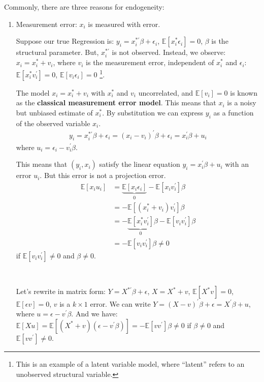 Commonly, there are three reasons for endogeneity:
\begin{enumerate}
    \item Measurement error: $x_i$ is measured with error.
        
        Suppose our true Regression is: $y_i = x_i^{* \prime} \beta +\epsilon_i$, $\mathbb{E}[x_i^* \epsilon_i] = 0$, $\beta$ is the structural parameter.
        But, $x_i^{* \prime}$ is not observed. Instead, we observe: $x_i = x_i^* + v_i$, 
        where $v_i$ is the measurement error, independent of $x_i^*$ and $\epsilon_i$: $\mathbb{E}[x_i^* v_i^{\prime}] = 0$, $\mathbb{E}[v_i \epsilon_i] = 0$
        \footnote{This is an example of a latent variable model, where ``latent'' refers to an unobserved structural variable.}.

        The model $x_i = x_i^* + v_i$ with $x_i^*$ and $v_{i}$ uncorrelated, and $\mathbb{E}[v_i] = 0$ is known as the \textbf{classical measurement error model}.
        This means that $x_i$ is a noisy but unbiased estimate of $x_i^*$.
        By substitution we can express $y_i$ as a function of the observed variable $x_i$.
        \begin{gather*}
            y_i = x_i^{* \prime} \beta +\epsilon_i = (x_i - v_i)^{\prime} \beta +\epsilon_i = x_i^{\prime} \beta + u_i
        \end{gather*}
        where $u_i = \epsilon_i - v_i^{\prime} \beta$.

        This means that $(y_i, x_i)$ satisfy the linear equation $y_i = x_i^{\prime} \beta + u_i$ with an error $u_i$.
        But this error is not a projection error.
        \begin{align*}
            \mathbb{E}[x_i u_i] &= \underset{0}{\underbrace{\mathbb{E}[x_i \epsilon_i]}} - \mathbb{E}[x_i v_i^{\prime} ]\beta \\
            &= -\mathbb{E}[(x_i^* + v_i) v_i^{\prime} ]\beta \\
            &= -\underset{0}{\underbrace{\mathbb{E}[x_i^* v_i^{\prime}]}}\beta - \mathbb{E}[v_i v_i^{\prime} ]\beta \\
            &= - \mathbb{E}[v_i v_i^{\prime} ]\beta \neq 0
        \end{align*}
        if $\mathbb{E}[v_i v_i^{\prime}] \neq 0$ and $\beta \neq 0$.

        \begin{remark}
            \

            Let's rewrite in matrix form: $Y = X^{* \prime} \beta + \epsilon $, $X = X^* + v$, $\mathbb{E}[X^* v] = 0$, $\mathbb{E}[\epsilon v] = 0$,
            $v$ is a $k \times 1$ error. We can write $Y = (X - v)^{\prime} \beta + \epsilon = X^{\prime} \beta + u$,
            where $u = \epsilon - v^{\prime} \beta.$ And we have: $\mathbb{E}[X u] = \mathbb{E}[(X^* + v)(\epsilon - v^{\prime} \beta)] = -\mathbb{E}[v v^{\prime}]\beta \neq 0$
            if $\beta \neq 0$ and $\mathbb{E}[v v^{\prime}] \neq 0.$


\end{remark}
\end{enumerate}
